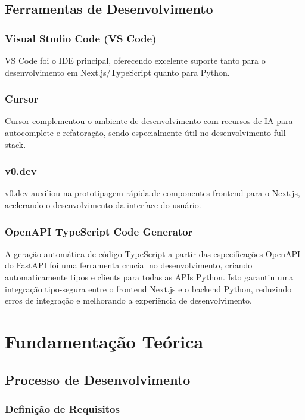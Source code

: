\documentclass[tcc,capa]{texufpel}
\begin{document}
\section{Ferramentas de Desenvolvimento}

\subsection{Visual Studio Code (VS Code)}
VS Code foi o IDE principal, oferecendo excelente suporte tanto para o desenvolvimento em Next.js/TypeScript quanto para Python.

\subsection{Cursor}
Cursor complementou o ambiente de desenvolvimento com recursos de IA para autocomplete e refatoração, sendo especialmente útil no desenvolvimento full-stack.

\subsection{v0.dev}
v0.dev auxiliou na prototipagem rápida de componentes frontend para o Next.js, acelerando o desenvolvimento da interface do usuário.

\subsection{OpenAPI TypeScript Code Generator}
A geração automática de código TypeScript a partir das especificações OpenAPI do FastAPI foi uma ferramenta crucial no desenvolvimento, criando automaticamente tipos e clients para todas as APIs Python. Isto garantiu uma integração tipo-segura entre o frontend Next.js e o backend Python, reduzindo erros de integração e melhorando a experiência de desenvolvimento.










\chapter{Fundamentação Teórica}
\section{Processo de Desenvolvimento}
\subsection{Definição de Requisitos}
\end{document}
